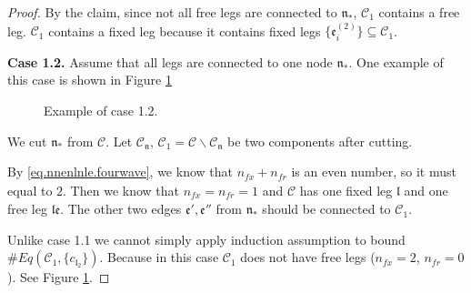 \begin{proof}
    By the claim, since not all free legs are connected to $\mathfrak{n}_*$, $\mathcal{C}_1$ contains a free leg. $\mathcal{C}_1$ contains a fixed leg because it contains fixed legs $\{\mathfrak{e}_{i}^{(2)}\}\subseteq \mathcal{C}_1$.
    
    \textbf{Case 1.2.} Assume that all legs are connected to one node $\mathfrak{n}_*$. One example of this case is shown in Figure \ref{fig.examplecase1.2.fourwave}
    
    \begin{figure}[H]
     \centering
     \caption{Example of case 1.2.}
     \label{fig.examplecase1.2.fourwave}
    \end{figure}
    
    We cut $\mathfrak{n}_*$ from $\mathcal{C}$. Let $\mathcal{C}_{\mathfrak{n}}$, $\mathcal{C}_1=\mathcal{C}\backslash \mathcal{C}_{\mathfrak{n}}$ be two components after cutting.
    
    By \eqref{eq.nnenlnle.fourwave}, we know that $n_{\textit{fx}}+n_{\textit{fr}}$ is an even number, so it must equal to $2$. Then we know that $n_{\textit{fx}}=n_{\textit{fr}}=1$ and $\mathcal{C}$ has one fixed leg $\mathfrak{l}$ and one free leg $\mathfrak{l}\mathfrak{e}$. The other two edges $\mathfrak{e}', \mathfrak{e}''$ from $\mathfrak{n}_*$ should be connected to $\mathcal{C}_1$.
    
    Unlike case 1.1 we cannot simply apply induction assumption to bound $\# Eq(\mathcal{C}_1, \{c_{\mathfrak{l}_2}\})$. Because in this case $\mathcal{C}_1$ does not have free legs ($n_{\textit{fx}}=2$, $n_{\textit{fr}}=0$). See Figure \ref{fig.examplecase1.2.fourwave}.
    

\end{proof}
